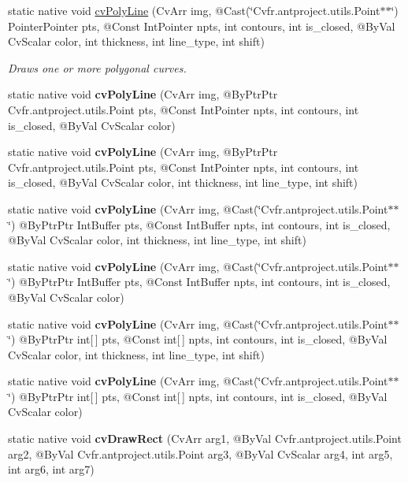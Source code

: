 \begin{DoxyCompactItemize}
\item 
static native void \hyperlink{group__imgproc__c_ga6e673e2e62b461c739fd8ac6fef9d226}{cv\+Poly\+Line} (Cv\+Arr img, @Cast(\char`\"{}Cv\+fr.antproject.utils.Point$\ast$$\ast$\char`\"{}) Pointer\+Pointer pts, @Const Int\+Pointer npts, int contours, int is\+\_\+closed, @By\+Val Cv\+Scalar color, int thickness, int line\+\_\+type, int shift)
\begin{DoxyCompactList}\small\item\em Draws one or more polygonal curves. \end{DoxyCompactList}\item 
static native void {\bfseries cv\+Poly\+Line} (Cv\+Arr img, @By\+Ptr\+Ptr Cv\+fr.antproject.utils.Point pts, @Const Int\+Pointer npts, int contours, int is\+\_\+closed, @By\+Val Cv\+Scalar color)
\item 
static native void {\bfseries cv\+Poly\+Line} (Cv\+Arr img, @By\+Ptr\+Ptr Cv\+fr.antproject.utils.Point pts, @Const Int\+Pointer npts, int contours, int is\+\_\+closed, @By\+Val Cv\+Scalar color, int thickness, int line\+\_\+type, int shift)
\item 
static native void {\bfseries cv\+Poly\+Line} (Cv\+Arr img, @Cast(\char`\"{}Cv\+fr.antproject.utils.Point$\ast$$\ast$\char`\"{}) @By\+Ptr\+Ptr Int\+Buffer pts, @Const Int\+Buffer npts, int contours, int is\+\_\+closed, @By\+Val Cv\+Scalar color, int thickness, int line\+\_\+type, int shift)
\item 
static native void {\bfseries cv\+Poly\+Line} (Cv\+Arr img, @Cast(\char`\"{}Cv\+fr.antproject.utils.Point$\ast$$\ast$\char`\"{}) @By\+Ptr\+Ptr Int\+Buffer pts, @Const Int\+Buffer npts, int contours, int is\+\_\+closed, @By\+Val Cv\+Scalar color)
\item 
static native void {\bfseries cv\+Poly\+Line} (Cv\+Arr img, @Cast(\char`\"{}Cv\+fr.antproject.utils.Point$\ast$$\ast$\char`\"{}) @By\+Ptr\+Ptr int\mbox{[}$\,$\mbox{]} pts, @Const int\mbox{[}$\,$\mbox{]} npts, int contours, int is\+\_\+closed, @By\+Val Cv\+Scalar color, int thickness, int line\+\_\+type, int shift)
\item 
static native void {\bfseries cv\+Poly\+Line} (Cv\+Arr img, @Cast(\char`\"{}Cv\+fr.antproject.utils.Point$\ast$$\ast$\char`\"{}) @By\+Ptr\+Ptr int\mbox{[}$\,$\mbox{]} pts, @Const int\mbox{[}$\,$\mbox{]} npts, int contours, int is\+\_\+closed, @By\+Val Cv\+Scalar color)
\item 
static native void {\bfseries cv\+Draw\+Rect} (Cv\+Arr arg1, @By\+Val Cv\+fr.antproject.utils.Point arg2, @By\+Val Cv\+fr.antproject.utils.Point arg3, @By\+Val Cv\+Scalar arg4, int arg5, int arg6, int arg7)
$$
\end{DoxyCompactItemize}
